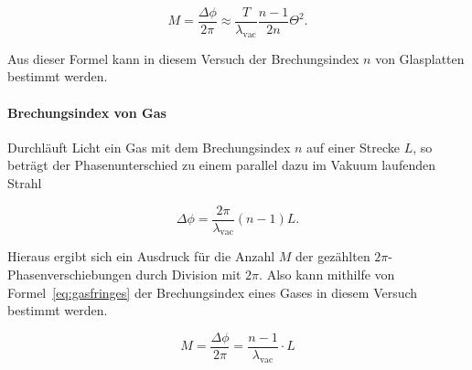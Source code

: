 \begin{equation}
M = \frac{\Delta\phi}{2\pi} \approx \frac{T}{\lambda_\text{vac}}
\frac{n-1}{2n}\Theta^2.
\label{eq:glasfringes}
\end{equation}

Aus dieser Formel kann in diesem Versuch der Brechungsindex $n$ von Glasplatten bestimmt werden.

\paragraph{Brechungsindex von Gas}
Durchläuft Licht ein Gas mit dem Brechungsindex $n$ auf einer Strecke $L$, so beträgt der Phasenunterschied zu einem parallel dazu im Vakuum laufenden Strahl

\begin{equation}
\Delta\phi = \frac{2\pi}{\lambda_\text{vac}}(n-1)L.
\end{equation}

Hieraus ergibt sich ein Ausdruck für die Anzahl $M$ der gezählten $2\pi$-Phasen\-ver\-schie\-bung\-en durch Division mit $2\pi$. Also kann mithilfe von Formel~\eqref{eq:gasfringes} der Brechungsindex eines Gases in diesem Versuch bestimmt werden.

\begin{equation}
M = \frac{\Delta\phi}{2\pi} = \frac{n-1}{\lambda_\text{vac}}\cdot L
\label{eq:gasfringes}
\end{equation}
